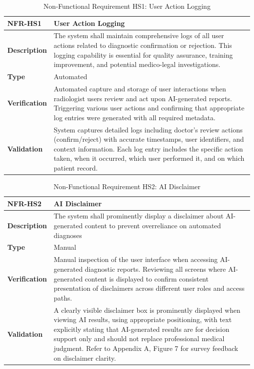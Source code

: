 \documentclass[12pt, titlepage]{article}
\begin{document}
\begin{table}[h!]
\centering
{}
\begin{tabular}{|p{3.5cm}|p{11.5cm}|}
\hline
\rowcolor{gray!30}
\textbf{NFR-HS1} & \textbf{User Action Logging} \\
\hline
\textbf{Description} & The system shall maintain comprehensive logs of all user actions related to diagnostic confirmation or rejection. This logging capability is essential for quality assurance, training improvement, and potential medico-legal investigations. \\
\hline
\textbf{Type} & Automated \\
\hline
\textbf{Verification} & Automated capture and storage of user interactions when radiologist users review and act upon AI-generated reports. Triggering various user actions and confirming that appropriate log entries were generated with all required metadata. \\
\hline
\textbf{Validation} & System captures detailed logs including doctor's review actions (confirm/reject) with accurate timestamps, user identifiers, and context information. Each log entry includes the specific action taken, when it occurred, which user performed it, and on which patient record. \\
\hline
\end{tabular}
\caption{Non-Functional Requirement HS1: User Action Logging}
\end{table}

\begin{table}[h!]
\centering
{}
\begin{tabular}{|p{3.5cm}|p{11.5cm}|}
\hline
\rowcolor{gray!30}
\textbf{NFR-HS2} & \textbf{AI Disclaimer} \\
\hline
\textbf{Description} & The system shall prominently display a disclaimer about AI-generated content to prevent overreliance on automated diagnoses \\
\hline
\textbf{Type} & Manual \\
\hline
\textbf{Verification} & Manual inspection of the user interface when accessing AI-generated diagnostic reports. Reviewing all screens where AI-generated content is displayed to confirm consistent presentation of disclaimers across different user roles and access paths. \\
\hline
\textbf{Validation} & A clearly visible disclaimer box is prominently displayed when viewing AI results, using appropriate positioning, with text explicitly stating that AI-generated results are for decision support only and should not replace professional medical judgment. Refer to Appendix A, Figure 7 for survey feedback on disclaimer clarity. \\
\hline
\end{tabular}
\caption{Non-Functional Requirement HS2: AI Disclaimer}
\end{table}
\end{document}
